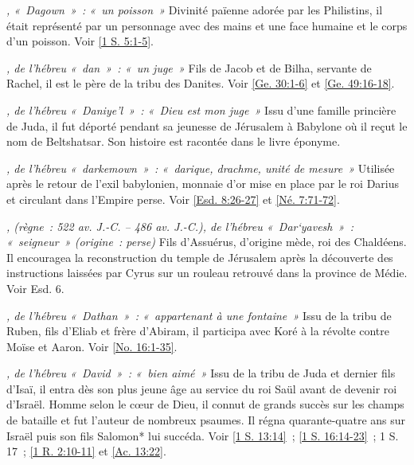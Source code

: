 \begin{multicols}{2}
\textit{, «~Dagown~»~: «~un poisson~»}\newline
Divinité païenne adorée par les Philistins, il était représenté par un personnage avec des mains et une face humaine et le corps d'un poisson. Voir \vref{1 S. 5:1-5}.

\textit{, de l'hébreu «~dan~»~: «~un juge~»}\newline
Fils de Jacob et de Bilha, servante de Rachel, il est le père de la tribu des Danites. Voir \vref{Ge. 30:1-6} et \vref{Ge. 49:16-18}.

\textit{, de l'hébreu «~Daniye'l~»~: «~Dieu est mon juge~»}\newline
Issu d'une famille princière de Juda, il fut déporté pendant sa jeunesse de Jérusalem à Babylone où il reçut le nom de Beltshatsar. Son histoire est racontée dans le livre éponyme.

\textit{, de l'hébreu «~darkemown~»~: «~darique, drachme, unité de mesure~»}\newline
Utilisée après le retour de l'exil babylonien, monnaie d'or mise en place par le roi Darius et circulant dans l'Empire perse. Voir \vref{Esd. 8:26-27} et \vref{Né. 7:71-72}.

\textit{, (règne~: 522 av. J.-C. – 486 av. J.-C.), de l'hébreu «~Dar`yavesh~»~: «~seigneur~» (origine~: perse)}\newline
Fils d'Assuérus, d'origine mède, roi des Chaldéens. Il encouragea la reconstruction du temple de Jérusalem après la découverte des instructions laissées par Cyrus sur un rouleau retrouvé dans la province de Médie. Voir Esd. 6.

\textit{, de l'hébreu «~Dathan~»~: «~appartenant à une fontaine~»}\newline
Issu de la tribu de Ruben, fils d'Eliab et frère d'Abiram, il participa avec Koré à la révolte contre Moïse et Aaron. Voir \vref{No. 16:1-35}.

\textit{, de l'hébreu «~David~»~: «~bien aimé~»}\newline
Issu de la tribu de Juda et dernier fils d'Isaï, il entra dès son plus jeune âge au service du roi Saül avant de devenir roi d'Israël. Homme selon le cœur de Dieu, il connut de grands succès sur les champs de bataille et fut l'auteur de nombreux psaumes. Il régna quarante-quatre ans sur Israël puis son fils Salomon* lui succéda. Voir \vref{1 S. 13:14}~; \vref{1 S. 16:14-23}~; 1 S. 17~; \vref{1 R. 2:10-11} et \vref{Ac. 13:22}.


\end{multicols}
